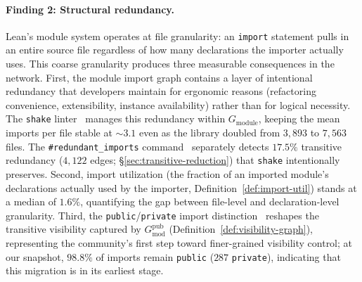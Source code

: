 \paragraph{Finding 2: Structural redundancy.}
Lean's module system operates at file granularity: an \texttt{import} statement pulls in an entire source file regardless of how many declarations the importer actually uses. This coarse granularity produces three measurable consequences in the network. First, the module import graph contains a layer of intentional redundancy that developers maintain for ergonomic reasons (refactoring convenience, extensibility, instance availability) rather than for logical necessity. The \texttt{shake} linter~\cite{baanen2025} manages this redundancy within $G_{\mathrm{module}}$, keeping the mean imports per file stable at ${\sim}3.1$ even as the library doubled from $3{,}893$ to $7{,}563$ files. The \texttt{\#redundant\_imports} command~\cite{importgraph} separately detects $17.5\%$ transitive redundancy ($4{,}122$ edges; \S\ref{sec:transitive-reduction}) that \texttt{shake} intentionally preserves. Second, import utilization (the fraction of an imported module's declarations actually used by the importer, Definition~\ref{def:import-util}) stands at a median of $1.6\%$, quantifying the gap between file-level and declaration-level granularity. Third, the \texttt{public}/\texttt{private} import distinction~\cite{lean4modules,lean4v4200,lean4v4220,lean4v4250} reshapes the transitive visibility captured by $G_{\mathrm{mod}}^{\mathrm{pub}}$ (Definition~\ref{def:visibility-graph}), representing the community's first step toward finer-grained visibility control; at our snapshot, $98.8\%$ of imports remain \texttt{public} ($287$ \texttt{private}), indicating that this migration is in its earliest stage.

